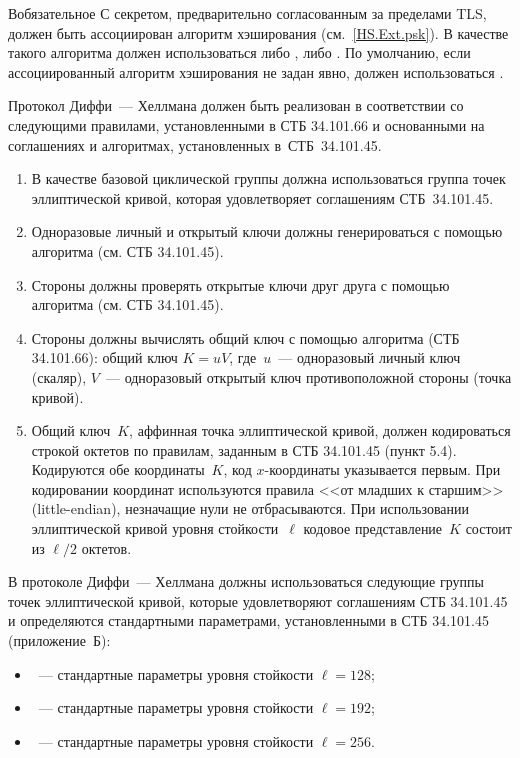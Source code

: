 \begin{appendix}{В}{обязательное}
С секретом, предварительно согласованным за пределами TLS, должен быть 
ассоциирован алгоритм хэширования (см.~\ref{HS.Ext.psk}). В качестве такого 
алгоритма должен использоваться либо , либо .
%
По умолчанию, если ассоциированный алгоритм хэширования не задан явно, должен 
использоваться .

\label{BSUITES.DH}

Протокол Диффи~--- Хеллмана должен быть реализован в соответствии со следующими 
правилами, установленными в СТБ 34.101.66 и основанными на соглашениях и 
алгоритмах, установленных в~СТБ~34.101.45.

\begin{enumerate}
\item
В качестве базовой циклической группы должна использоваться группа точек 
эллиптической кривой, которая удовлетворяет соглашениям СТБ~34.101.45.

\item
Одноразовые личный и открытый ключи должны генерироваться с помощью алгоритма
 (см. СТБ 34.101.45).

\item
Стороны должны проверять открытые ключи друг друга с помощью алгоритма
 (см. СТБ 34.101.45).

\item
Стороны должны вычислять общий ключ с помощью алгоритма  (СТБ
34.101.66): общий ключ $K=uV$, где~$u$~--- одноразовый личный ключ (скаляр),
$V$~--- одноразовый открытый ключ противоположной стороны (точка кривой).

\item
Общий ключ~$K$, аффинная точка эллиптической кривой, должен кодироваться строкой
октетов по правилам, заданным в СТБ 34.101.45 (пункт 5.4). Кодируются обе
координаты~$K$, код $x$-координаты указывается первым. При кодировании координат
используются правила <<от младших к старшим>> (little-endian), незначащие нули
не отбрасываются. При использовании эллиптической кривой уровня стойкости~$\ell$
кодовое представление~$K$ состоит из $\ell/2$ октетов.
\end{enumerate}

\label{BSUITES.Groups}

В протоколе Диффи~--- Хеллмана должны использоваться следующие группы точек 
эллиптической кривой, которые удовлетворяют соглашениям СТБ 34.101.45 и 
определяются стандартными параметрами, установленными в СТБ 34.101.45 
(приложение~Б):
\begin{itemize}
\item
{}~--- стандартные параметры уровня стойкости $\ell=128$;
\item
{}~--- стандартные параметры уровня стойкости $\ell=192$;
\item
{}~--- стандартные параметры уровня стойкости $\ell=256$.
\end{itemize}


\end{appendix}
